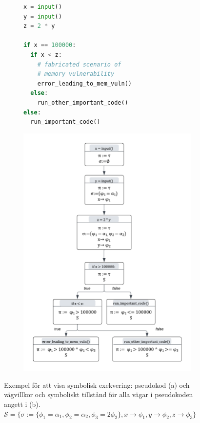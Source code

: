 \begin{figure}[H]
    \begin{subfigure}[b]{0.58\textwidth}
        \begin{lstlisting}[language=Python, frame=single,
        basicstyle=\normalfont\ttfamily]
x = input()
y = input()
z = 2 * y

if x == 100000:
  if x < z:
    # fabricated scenario of
    # memory vulnerability
    error_leading_to_mem_vuln()
  else:
    run_other_important_code()
else:
  run_important_code()
\end{lstlisting}
        \caption{} %
        \label{fig:symbex_example_code}
    \end{subfigure}
    \begin{subfigure}[t]{0.4\textwidth}
        \centering
        \includegraphics[scale=0.31]{figures/final_symbolic_example_graph.png}
        \caption{} %
        \label{fig:symbex_example_graph}
    \end{subfigure}

    \caption{Exempel för att visa symbolisk exekvering: pseudokod (a) och vägvillkor och symboliskt tillstånd för alla vägar i pseudokoden angett
        i (b). $  \mathcal{S} = \{\sigma := \{\phi_1 = \alpha_1, \phi_2 = \alpha_2, \phi_3 =
            2\phi_2\}, x \rightarrow \phi_1, y \rightarrow \phi_2, z \rightarrow
            \phi_3\}$}
\end{figure}

